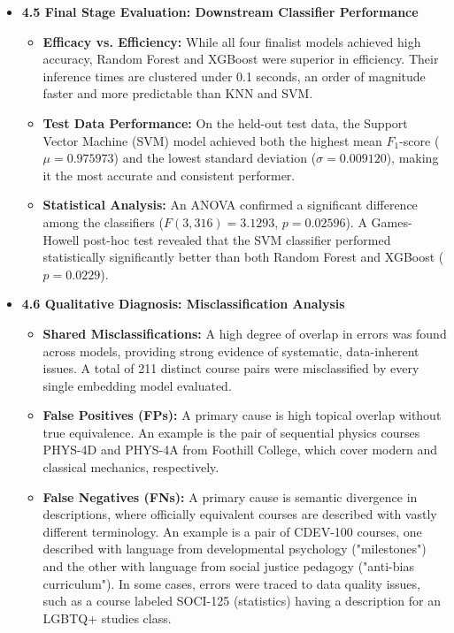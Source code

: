 \documentclass[11pt]{article}
\begin{document}
\begin{itemize}
\begin{itemize}
    \end{itemize}
    \item \textbf{4.5 Final Stage Evaluation: Downstream Classifier Performance}
    \begin{itemize}
        \item \textbf{Efficacy vs. Efficiency:} While all four finalist models achieved high accuracy, Random Forest and XGBoost were superior in efficiency. Their inference times are clustered under 0.1 seconds, an order of magnitude faster and more predictable than KNN and SVM.
        \item \textbf{Test Data Performance:} On the held-out test data, the Support Vector Machine (SVM) model achieved both the highest mean $F_{1}$-score ($\mu=0.975973$) and the lowest standard deviation ($\sigma=0.009120$), making it the most accurate and consistent performer.
        \item \textbf{Statistical Analysis:} An ANOVA confirmed a significant difference among the classifiers ($F(3,316)=3.1293$, $p=0.02596$). A Games-Howell post-hoc test revealed that the SVM classifier performed statistically significantly better than both Random Forest and XGBoost ($p=0.0229$).
    \end{itemize}
    \item \textbf{4.6 Qualitative Diagnosis: Misclassification Analysis}
    \begin{itemize}
        \item \textbf{Shared Misclassifications:} A high degree of overlap in errors was found across models, providing strong evidence of systematic, data-inherent issues. A total of 211 distinct course pairs were misclassified by every single embedding model evaluated.
        \item \textbf{False Positives (FPs):} A primary cause is high topical overlap without true equivalence. An example is the pair of sequential physics courses PHYS-4D and PHYS-4A from Foothill College, which cover modern and classical mechanics, respectively.
        \item \textbf{False Negatives (FNs):} A primary cause is semantic divergence in descriptions, where officially equivalent courses are described with vastly different terminology. An example is a pair of CDEV-100 courses, one described with language from developmental psychology ("milestones") and the other with language from social justice pedagogy ("anti-bias curriculum"). In some cases, errors were traced to data quality issues, such as a course labeled SOCI-125 (statistics) having a description for an LGBTQ+ studies class.
    \end{itemize}
\end{itemize}
\end{document}
